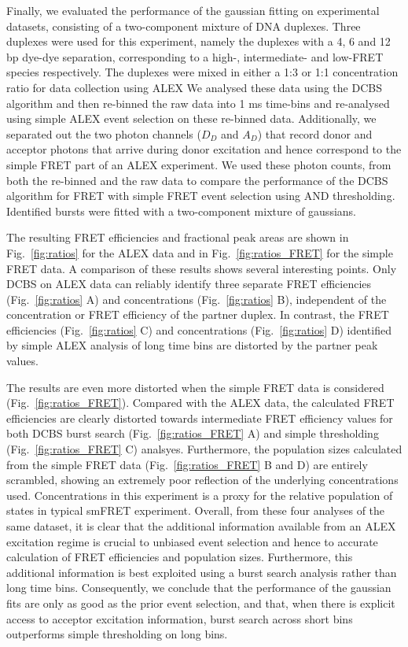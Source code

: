 Finally, we evaluated the performance of the gaussian fitting on experimental datasets, consisting of a two-component mixture of DNA duplexes. Three duplexes were used for this experiment, namely the duplexes with a 4, 6 and 12 bp dye-dye separation, corresponding to a high-, intermediate- and low-FRET species respectively. The duplexes were mixed in either a 1:3 or 1:1 concentration ratio for data collection using ALEX We analysed these data using the DCBS algorithm and then re-binned the raw data into 1 ms time-bins and re-analysed using simple ALEX event selection on these re-binned data. Additionally, we separated out the two photon channels ($D_D$ and $A_D$) that record donor and acceptor photons that arrive during donor excitation and hence correspond to the simple FRET part of an ALEX experiment. We used these photon counts, from both the re-binned and the raw data to compare the performance of the DCBS algorithm for FRET with simple FRET event selection using AND thresholding. Identified bursts were fitted with a two-component mixture of gaussians.

The resulting FRET efficiencies and fractional peak areas are shown in Fig.~\ref{fig:ratios} for the ALEX data and in Fig.~\ref{fig:ratios_FRET} for the simple FRET data. A comparison of these results shows several interesting points. Only DCBS on ALEX data can reliably identify three separate FRET efficiencies (Fig.~\ref{fig:ratios} A) and concentrations (Fig.~\ref{fig:ratios} B), independent of the concentration or FRET efficiency of the partner duplex. In contrast, the FRET efficiencies (Fig.~\ref{fig:ratios} C) and concentrations (Fig.~\ref{fig:ratios} D) identified by simple ALEX analysis of long time bins are distorted by the partner peak values.

The results are even more distorted when the simple FRET data is considered (Fig.~\ref{fig:ratios_FRET}). Compared with the ALEX data, the calculated FRET efficiencies are clearly distorted towards intermediate FRET efficiency values for both DCBS burst search (Fig.~\ref{fig:ratios_FRET} A) and simple thresholding (Fig.~\ref{fig:ratios_FRET} C) analsyes. Furthermore, the population sizes calculated from the simple FRET data (Fig.~\ref{fig:ratios_FRET} B and D) are entirely scrambled, showing an extremely poor reflection of the underlying concentrations used. Concentrations in this experiment is a proxy for the relative population of states in typical smFRET experiment. Overall, from these four analyses of the same dataset, it is clear that the additional information available from an ALEX excitation regime is crucial to unbiased event selection and hence to accurate calculation of FRET efficiencies and population sizes. Furthermore, this additional information is best exploited using a burst search analysis rather than long time bins. Consequently, we conclude that the performance of the gaussian fits are only as good as the prior event selection, and that, when there is explicit access to acceptor excitation information, burst search across short bins outperforms simple thresholding on long bins.

